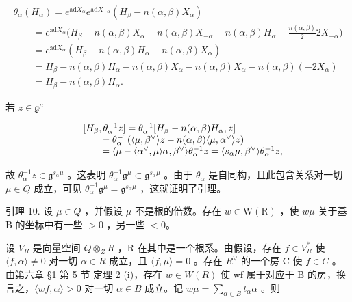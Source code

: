 \[
\begin{array}{l} \theta_ {\alpha} (H _ {\alpha}) = e ^ {\mathrm{ad} X _ {\alpha}} e ^ {\mathrm{ad} X _ {- \alpha}} (H _ {\beta} - n (\alpha , \beta) X _ {\alpha}) \\ \qquad = e ^ {\mathrm{ad} X _ {\alpha}} \bigg (H _ {\beta} - n (\alpha , \beta) X _ {\alpha} + n (\alpha , \beta) X _ {- \alpha} - n (\alpha , \beta) H _ {\alpha} - \frac {n (\alpha , \beta)}{2} 2 X _ {- \alpha} \bigg) \\ \qquad = e ^ {\mathrm{ad} X _ {\alpha}} \left(H _ {\beta} - n (\alpha , \beta) H _ {\alpha} - n (\alpha , \beta) X _ {\alpha}\right) \\ \qquad = H _ {\beta} - n (\alpha , \beta) H _ {\alpha} - n (\alpha , \beta) X _ {\alpha} - n (\alpha , \beta) X _ {\alpha} - n (\alpha , \beta) (- 2 X _ {\alpha}) \\ \qquad = H _ {\beta} - n (\alpha , \beta) H _ {\alpha}. \end{array}
\]

若 \(z\in \mathfrak{g}^{\mu}\)

\[
\begin{array}{r l} & {[ H _ {\beta}, \theta_ {\alpha} ^ {- 1} z ] = \theta_ {\alpha} ^ {- 1} [ H _ {\beta} - n (\alpha , \beta) H _ {\alpha}, z ]} \\ & {\qquad = \theta_ {\alpha} ^ {- 1} (\langle \mu , \beta^ {\vee} \rangle z - n (\alpha , \beta) \langle \mu , \alpha^ {\vee} \rangle z)} \\ & {\qquad = \langle \mu - \langle \alpha^ {\vee}, \mu \rangle \alpha , \beta^ {\vee} \rangle \theta_ {\alpha} ^ {- 1} z = \langle s _ {\alpha} \mu , \beta^ {\vee} \rangle \theta_ {\alpha} ^ {- 1} z,} \end{array}
\]

故 \(\theta_{\alpha}^{-1}z\in\mathfrak{g}^{s_{\alpha}\mu}\) 。这表明 \(\theta_{\alpha}^{-1}\mathfrak{g}^{\mu}\subset\mathfrak{g}^{s_{\alpha}\mu}\) 。由于 \(\theta_{\alpha}\) 是自同构，且此包含关系对一切 \(\mu\in Q\) 成立，可见 \(\theta_{\alpha}^{-1}\mathfrak{g}^{\mu}=\mathfrak{g}^{s_{\alpha}\mu}\) ，这就证明了引理。

引理 10. 设 \(\mu\in Q\) ，并假设 \(\mu\) 不是根的倍数。存在 \(w\in\mathrm{W}(\mathrm{R})\) ，使 \(w\mu\) 关于基 B 的坐标中有一些 \(> 0\) ，另一些 \(< 0\)。

设 \(V_{R}\) 是向量空间 \(Q \otimes_{Z} R\) ，R 在其中是一个根系。由假设，存在 \(f \in V_{R}^{*}\) 使 \(\langle f, \alpha \rangle \neq 0\) 对一切 \(\alpha \in R\) 成立，且 \(\langle f, \mu \rangle = 0\) 。存在 \(R^{\vee}\) 的一个房 C 使 \(f \in C\) 。由第六章 §1 第 5 节 定理 2 (i)，存在 \(w \in W(R)\) 使 wf 属于对应于 B 的房，换言之，\(\langle wf, \alpha \rangle > 0\) 对一切 \(\alpha \in B\) 成立。记 \(w\mu = \sum_{\alpha \in B} t_{\alpha}\alpha\) 。则

